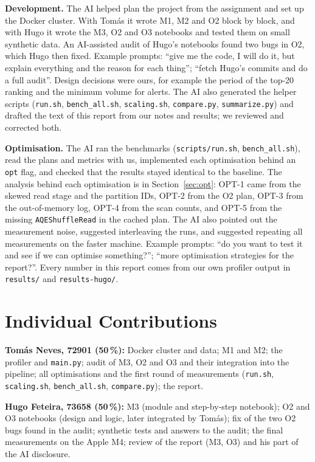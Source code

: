 \documentclass[sigconf]{acmart}
\begin{document}
\textbf{Development.} The AI helped plan the project from the assignment and set up the Docker cluster. With Tomás
it wrote M1, M2 and O2 block by block, and with Hugo it wrote the M3, O2 and O3 notebooks and tested them on small
synthetic data. An AI-assisted audit of Hugo's notebooks found two bugs in O2, which Hugo then fixed. Example
prompts: ``give me the code, I will do it, but explain everything and the reason for each thing''; ``fetch Hugo's
commits and do a full audit''. Design decisions were ours, for example the period of the top-20 ranking and the
minimum volume for alerts. The AI also generated the helper scripts (\texttt{run.sh}, \texttt{bench\_all.sh},
\texttt{scaling.sh}, \texttt{compare.py}, \texttt{summarize.py}) and drafted the text of this report from our notes and
results; we reviewed and corrected both.

\textbf{Optimisation.} The AI ran the benchmarks (\texttt{scripts/run.sh}, \texttt{bench\_all.sh}), read the plans
and metrics with us, implemented each optimisation behind an \texttt{opt} flag, and checked that the results stayed
identical to the baseline. The analysis behind each optimisation is in Section~\ref{sec:opt}: OPT-1 came from the
skewed read stage and the partition IDs, OPT-2 from the O2 plan, OPT-3 from the out-of-memory log, OPT-4 from the scan
counts, and OPT-5 from the missing \texttt{AQEShuffleRead} in the cached plan. The AI also pointed out the
measurement noise, suggested interleaving the runs, and suggested repeating all measurements on the faster machine.
Example prompts: ``do you want to test it and see if we can optimise something?''; ``more optimisation strategies for
the report?''. Every number in this report comes from our own profiler output in \texttt{results/} and
\texttt{results-hugo/}.

\section*{Individual Contributions}

\textbf{Tomás Neves, 72901 (50\,\%):} Docker cluster and data; M1 and M2; the profiler and \texttt{main.py}; audit of M3,
O2 and O3 and their integration into the pipeline; all optimisations and the first round of measurements
(\texttt{run.sh}, \texttt{scaling.sh}, \texttt{bench\_all.sh}, \texttt{compare.py}); the report.

\textbf{Hugo Feteira, 73658 (50\,\%):} M3 (module and step-by-step notebook); O2 and O3 notebooks (design and logic,
later integrated by Tomás); fix of the two O2 bugs found in the audit; synthetic tests and answers to the audit; the
final measurements on the Apple M4; review of the report (M3, O3) and his part of the AI disclosure.
\end{document}
